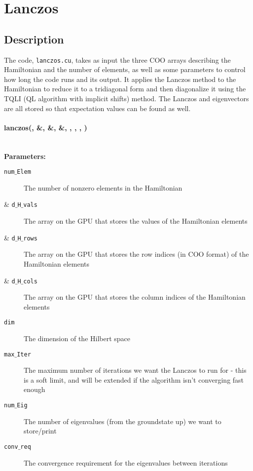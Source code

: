 \documentclass{article}
\begin{document}
\section{Lanczos}

\subsection{Description}
The code, \texttt{lanczos.cu}, takes as input the three COO arrays describing the Hamiltonian and the number of elements, as well as some parameters to control how long the code runs and its output. 
It applies the Lanczos method to the Hamiltonian to reduce it to a tridiagonal form and then diagonalize it using the TQLI (QL algorithm with implicit shifts) method. 
The Lanczos and eigenvectors are all stored so that expectation values can be found as well.  

\paragraph{\host \void lanczos(\const \int , \const \cuDoubleComplex \&, \const \ptrint \&, \const \ptrint \&, \const \int , \int , \const \int , \const \double )\\ \\ }

\noindent\textbf{Parameters:}
\begin{description}
\item[\const \int \texttt{num$\_$Elem}]{The number of nonzero elements in the Hamiltonian}
\item[\const \cuDoubleComplex \& \texttt{d$\_$H$\_$vals} ]{The array on the GPU that stores the values of the Hamiltonian elements}
\item[\const \ptrint \& \texttt{d$\_$H$\_$rows}]{The array on the GPU that stores the row indices (in COO format) of the Hamiltonian elements}
\item[\const \ptrint \& \texttt{d$\_$H$\_$cols}]{The array on the GPU that stores the column indices of the Hamiltonian elements}
\item[\const \ptrint \texttt{dim}]{The dimension of the Hilbert space}
\item[\int \texttt{max$\_$Iter}]{The maximum number of iterations we want the Lanczos to run for - this is a soft limit, and will be extended if the algorithm isn't converging fast enough}
\item[\const \int \texttt{num$\_$Eig}]{The number of eigenvalues (from the groundstate up) we want to store/print}
\item[\const \double \texttt{conv$\_$req}]{The convergence requirement for the eigenvalues between iterations}
\end{description}
\end{document}
